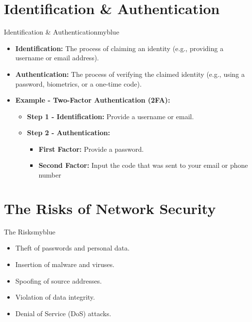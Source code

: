 \section{Identification \& Authentication}
\begin{prettyBox}{Identification \& Authentication}{myblue}
\begin{itemize}
    \item \textbf{Identification:} The process of claiming an identity (e.g., providing a username or email address).
    \item \textbf{Authentication:} The process of verifying the claimed identity (e.g., using a password, biometrics, or a one-time code).
    \item \textbf{Example - Two-Factor Authentication (2FA):} 
    \begin{itemize}
        \item \textbf{Step 1 - Identification:} Provide a username or email.
        \item \textbf{Step 2 - Authentication:} 
        \begin{itemize}
            \item \textbf{First Factor:} Provide a password.
            \item \textbf{Second Factor:} Input the code that was sent to your email or phone number
        \end{itemize}
    \end{itemize}
\end{itemize}
\end{prettyBox}

\vspace{0.75cm}

\section{The Risks of Network Security}
\begin{prettyBox}{The Risks}{myblue}
\begin{itemize}
    \item Theft of passwords and personal data.
    \item Insertion of malware and viruses.
    \item Spoofing of source addresses.
    \item Violation of data integrity.
    \item Denial of Service (DoS) attacks.
\end{itemize}
\end{prettyBox}

